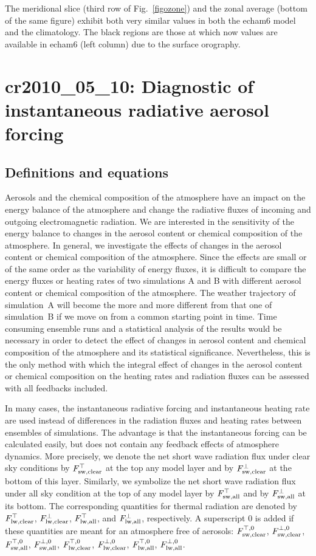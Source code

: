 \begin{appendix}
The meridional slice (third row of Fig.~\ref{figozone})  and the zonal
average (bottom of the same figure) exhibit both very similar values
in both the echam6 model and the climatology. The black regions are
those at which now values are available in echam6 (left column) due to
the surface orography.

\clearpage\newpage
\section[cr2010\_05\_10: Aerosol forcing]{cr2010\_05\_10: Diagnostic of instantaneous radiative aerosol forcing}\label{cr20100510}

\subsection{Definitions and equations}


Aerosols and the chemical composition of the atmosphere have an impact
on the energy balance of 
the atmosphere and change the radiative fluxes of incoming and
outgoing electromagnetic radiation.
We are interested in the sensitivity of the energy balance to changes
in the aerosol content or chemical composition of the atmosphere.
In general, we investigate the effects of changes in the
aerosol content or 
chemical composition of the atmosphere. Since the effects are small
or of the same order as the variability of 
energy fluxes, it is difficult to compare the energy fluxes
or heating rates of two simulations A and B with different aerosol content or
chemical composition of the atmosphere. The weather trajectory of
simulation~A will become the more and more different from that one
of simulation~B if we move on from a common starting point in time. 
Time consuming ensemble runs and a statistical analysis of the results
would be necessary in order to detect the effect of changes in
aerosol content and chemical composition of the atmosphere and its
statistical significance. Nevertheless, this is the only method with
which the integral effect of changes in the aerosol content or
chemical composition on the heating rates and radiation fluxes can be
assessed with all feedbacks included. 

In many cases, the instantaneous radiative forcing and instantaneous
heating rate are used instead of differences in the radiation
fluxes and heating rates between ensembles of simulations. The
advantage is that the instantaneous forcing can be calculated easily,
but does not contain any feedback effects of atmosphere dynamics. More
precisely, we denote the net short wave radiation flux under clear sky
conditions by $F^{\top}_{\rm sw, clear}$ at the top any model layer and by $F^{\bot}_{\rm sw, clear}$ at
the bottom of this layer. Similarly, we symbolize the net short wave
radiation flux under all sky condition at the top of any model layer
by $F^{\top}_{\rm sw, all}$ and by $F^{\bot}_{\rm sw, all}$ at its bottom. The corresponding quantities
for thermal radiation are denoted by $F^{\top}_{\rm lw, clear}$, $F^{\bot}_{\rm lw, clear}$, $F^{\top}_{\rm lw, all}$, and
$F^{\bot}_{\rm lw, all}$, respectively. A superscript 0 is added if these quantities
are meant for an atmosphere free of aerosols:
$F^{\top,0}_{\rm sw, clear}$, $F^{\bot,0}_{\rm sw, clear}$, $F^{\top,0}_{\rm sw, all}$, $F^{\bot,0}_{\rm sw, all}$, 
$F^{\top,0}_{\rm lw, clear}$, $F^{\bot,0}_{\rm lw, clear}$, $F^{\top,0}_{\rm lw, all}$, $F^{\bot,0}_{\rm lw, all}$.


\end{appendix}
